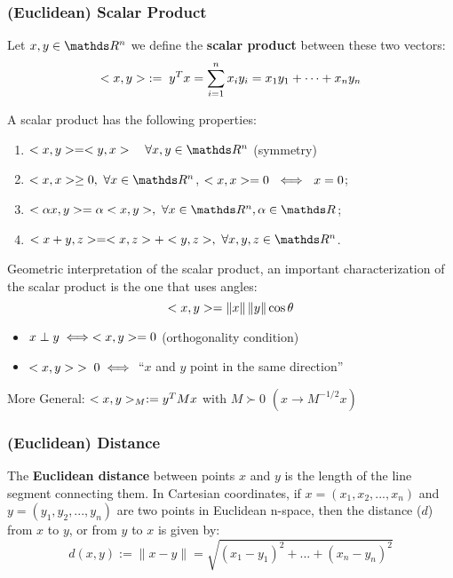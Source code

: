 \documentclass[ComputationalMathematics.tex]{subfiles}
\begin{document}


\subsubsection{(Euclidean) Scalar Product}

\begin{definition}
  Let $x, y \in \R^n$ we define the \textbf{scalar product} between these two vectors:
  \[
<x, y> \; := \; y^T x = \sum_{i=1}^n x_i y_i = x_1 y_1 + \cdots + x_n y_n
  \]
\end{definition}

\begin{proposition}
A scalar product has the following properties:
\begin{enumerate}
  \item $\ps{x}{y} = \ps{y}{x} \quad \forall x, y \in \R^n$ (symmetry)
  \item $\ps{x}{x} \ge 0,~\forall x \in \R^n$, $<x, x>=0~\iff~x=0$;
  \item $\ps{\alpha x}{y} = \alpha \ps{x}{y},~\forall x\in\R^n, \alpha \in \R$;
  \item $\ps{x + y}{z} = \ps{x}{z} + \ps{y}{z},~\forall x,y, z \in \R^n$.
\end{enumerate}
\end{proposition}

Geometric interpretation of the scalar product, an important characterization of the scalar product is the one that uses angles:
$$<x, y> = \left\lVert x\right\rVert \left\lVert y\right\rVert \cos \theta$$ 
\begin{itemize}
    \item $x \perp y \iff <x, y> = 0$ (orthogonality condition)
    \item $<x, y> \; >\;  0 \iff$ ``$x$ and $y$ point in the same direction''
\end{itemize}

\noindent More General: $ <x, y>_M := y^TMx $ with $M \succ 0$  $( x \longrightarrow M^{-1/2}x)$

\subsubsection{(Euclidean) Distance}
\begin{definition}
The \textbf{Euclidean distance} between points $x$ and $y$ is the length of the line segment connecting them. In Cartesian coordinates, if $x = (x_{1}, x_{2},..., x_{n})$ and $y = (y_{1}, y_{2},..., y_{n})$ are two points in Euclidean n-space, then the distance ($d$) from $x$ to $y$, or from $y$ to $x$ is given by:
  \[
    d(x,y) := \lVert x - y \rVert = \sqrt{(x_{1} - y_{1})^{2} + ... + (x_{n} - y_{n})^{2}} 
  \]
  
\end{definition}
 
\end{document}
